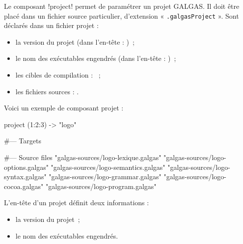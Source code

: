 




Le composant \ggsq!project! permet de paramétrer un projet GALGAS. Il doit être placé dans un fichier source particulier, d'extension « \texttt{.galgasProject} ». Sont déclarés dans un fichier projet :
\begin{itemize}
  \item la version du projet (dans l'en-tête : )~;
  \item le nom des exécutables engendrés (dans l'en-tête : )~;
  \item les cibles de compilation :  ~;
  \item les fichiers sources : .
\end{itemize}

Voici un exemple de composant projet :

\begin{galgas4}
project (1:2:3) -> "logo" {
#--- Targets

#--- Source files
  "galgas-sources/logo-lexique.galgas"
  "galgas-sources/logo-options.galgas"
  "galgas-sources/logo-semantics.galgas"
  "galgas-sources/logo-syntax.galgas"
  "galgas-sources/logo-grammar.galgas"
  "galgas-sources/logo-cocoa.galgas"
  "galgas-sources/logo-program.galgas"
}
\end{galgas4}








L'en-tête d'un projet définit deux informations :
\begin{itemize}
  \item la version du projet~;
  \item le nom des exécutables engendrés.
\end{itemize}

